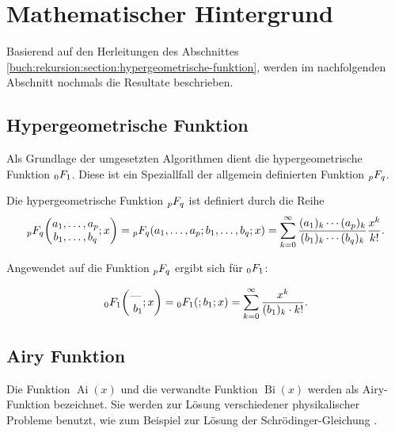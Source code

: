 %
%
%
\section{Mathematischer Hintergrund
\label{0f1:section:mathHintergrund}}
Basierend auf den Herleitungen des Abschnittes \ref{buch:rekursion:section:hypergeometrische-funktion}, werden im nachfolgenden Abschnitt nochmals die Resultate
beschrieben.

\subsection{Hypergeometrische Funktion
\label{0f1:subsection:hypergeometrisch}}
Als Grundlage der umgesetzten Algorithmen dient die hypergeometrische Funktion $\mathstrut_0F_1$. Diese ist ein Speziallfall der allgemein definierten Funktion $\mathstrut_pF_q$.

\begin{definition}
	\label{0f1:math:qFp:def}
	Die hypergeometrische Funktion
	$\mathstrut_pF_q$ ist definiert durch die Reihe
	\[
	\mathstrut_pF_q
	\biggl(
	\begin{matrix}
		a_1,\dots,a_p\\
		b_1,\dots,b_q
	\end{matrix}
	;
	x
	\biggr)
	=
	\mathstrut_pF_q(a_1,\dots,a_p;b_1,\dots,b_q;x)
	=
	\sum_{k=0}^\infty
	\frac{(a_1)_k\cdots(a_p)_k}{(b_1)_k\cdots(b_q)_k}\frac{x^k}{k!}.
	\]
\end{definition}

Angewendet auf die Funktion $\mathstrut_pF_q$ ergibt sich für $\mathstrut_0F_1$:

\begin{equation}
    \label{0f1:math:0f1:eq}
    \mathstrut_0F_1
    \biggl(
    \begin{matrix}
    \text{---}
    \\\
    b_1
    \end{matrix}
    ;
    x
    \biggr)
    =
    \mathstrut_0F_1(;b_1;x)
    =
    \sum_{k=0}^\infty
    \frac{x^k}{(b_1)_k \cdot k!}.
\end{equation}




\subsection{Airy Funktion
\label{0f1:subsection:airy}}
Die Funktion $\operatorname{Ai}(x)$ und die verwandte Funktion $\operatorname{Bi}(x)$ werden als Airy-Funktion bezeichnet. Sie werden zur Lösung verschiedener physikalischer Probleme benutzt, wie zum Beispiel zur Lösung der Schrödinger-Gleichung \cite{0f1:wiki-airyFunktion}.

